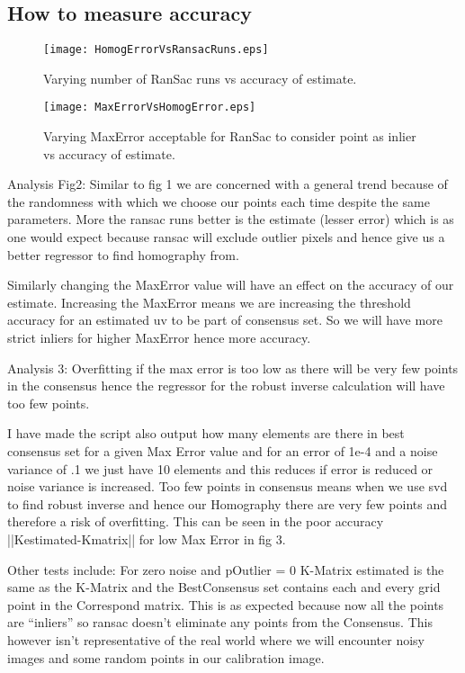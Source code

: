 \documentclass[titlepage]{article}
\begin{document}
\subsection{How to measure accuracy}
\begin{wrapfigure}{r}{5.5cm}
\caption{Varying number of RanSac runs vs accuracy of estimate.}\label{wrap-fig:1}
\texttt{[image: HomogErrorVsRansacRuns.eps]}
\end{wrapfigure} 



\begin{wrapfigure}{r}{5.5cm}
\caption{Varying MaxError acceptable for RanSac to consider point as inlier vs accuracy of estimate.}\label{wrap-fig:1}
\texttt{[image: MaxErrorVsHomogError.eps]}
\end{wrapfigure} 

Analysis Fig2: Similar to fig 1 we are concerned with a general trend because of the randomness with which we choose our points each time despite the same parameters. More the ransac runs better is the estimate (lesser error) which is as one would expect because ransac will exclude outlier pixels and hence give us a better regressor to find homography from.

Similarly changing the MaxError value will have an effect on the accuracy of our estimate. Increasing the MaxError means we are increasing the threshold accuracy for an estimated uv to be part of consensus set. So we will have more strict inliers for higher MaxError hence more accuracy.

Analysis 3: Overfitting if the max error is too low as there will be very few points in the consensus hence the regressor for the robust inverse calculation will have too few points.

I have made the script also output how many elements are there in best consensus set for a given Max Error value and for an error of 1e-4 and a noise variance of .1 we just have 10 elements and this reduces if error is reduced or noise variance is increased. Too few points in consensus means when we use svd to find robust inverse and hence our Homography there are very few points and therefore a risk of overfitting. This can be seen in the poor accuracy ||Kestimated-Kmatrix|| for low Max Error in fig 3.

Other tests include: 
For zero noise and pOutlier = 0 K-Matrix estimated is the same as the K-Matrix and the BestConsensus set contains each and every grid point in the Correspond matrix. This is as expected because now all the points are “inliers” so ransac doesn't eliminate any points from the Consensus. This however isn't representative of the real world where we will encounter noisy images and some random points in our calibration image. 
\end{document}
